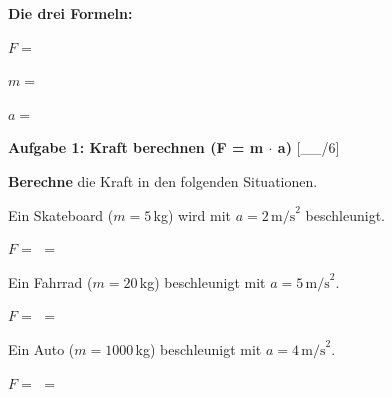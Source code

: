 \documentclass[11pt, a4paper]{article}
\newcommand{\luecke}[1]{\underline{\hspace{#1}}}
\newcommand{\punktebox}[1]{\hfill\small\textcolor{mittelgrau}{[\_\_/#1]}}
\newcommand{\aufgabe}[1]{%
    \needspace{4\baselineskip}%
    \vspace{10pt}%
    \noindent\textbf{\textcolor{fachfarbe}{Aufgabe #1}}%
    \vspace{4pt}%
    \nopagebreak[4]%
}
\newcommand{\operator}[1]{\textbf{\textcolor{fachfarbe}{#1}}}
\begin{document}
\begin{merkkasten}[title={\textbf{Kasten 4: Das Formel-Dreieck}}]
\begin{minipage}{0.45\linewidth}
\begin{center}
\end{center}
\end{minipage}%
\hfill
\begin{minipage}{0.5\linewidth}
\textbf{Die drei Formeln:}

\vspace{0.3em}
$F = $ \luecke{2cm}

\vspace{0.3em}
$m = $ \luecke{2cm}

\vspace{0.3em}
$a = $ \luecke{2cm}
\end{minipage}
\end{merkkasten}


\aufgabe{1: Kraft berechnen (F = m $\cdot$ a)} \punktebox{6}

\operator{Berechne} die Kraft in den folgenden Situationen.

\begin{teil}
    \item Ein Skateboard ($m = 5\,$kg) wird mit $a = 2\,\text{m/s}^2$ beschleunigt.

    \vspace{0.5em}
    $F = $ \luecke{6cm} $= $ \luecke{2cm}
    \vspace{0.8em}

    \item Ein Fahrrad ($m = 20\,$kg) beschleunigt mit $a = 5\,\text{m/s}^2$.

    \vspace{0.5em}
    $F = $ \luecke{6cm} $= $ \luecke{2cm}
    \vspace{0.8em}

    \item Ein Auto ($m = 1000\,$kg) beschleunigt mit $a = 4\,\text{m/s}^2$.

    \vspace{0.5em}
    $F = $ \luecke{6cm} $= $ \luecke{2cm}
    \vspace{0.5em}
\end{teil}
\end{document}
